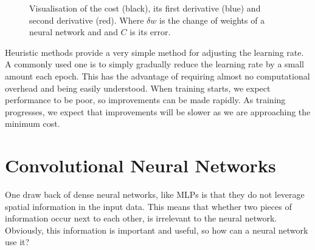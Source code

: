 \begin{figure}
\begin{center}
\caption{Visualisation of the cost (black), its first derivative (blue) and second derivative (red). Where $\delta w$ is the change of weights of a neural network and and $C$ is its error.}
\label{fig:2ndordr}
\end{center}
\end{figure}

Heuristic methods provide a very simple method for adjusting the learning rate. A commonly used one is to simply gradually reduce the learning rate by a small amount each epoch. This has the advantage of requiring almost no computational overhead and being easily understood. When training starts, we expect performance to be poor, so improvements can be made rapidly. As training progresses, we expect that improvements will be slower as we are approaching the minimum cost.

\section{Convolutional Neural Networks}
One draw back of dense neural networks, like MLPs is that they do not leverage spatial information in the input data. This means that whether two pieces of information occur next to each other, is irrelevant to the neural network. Obviously, this information is important and useful, so how can a neural network use it?

